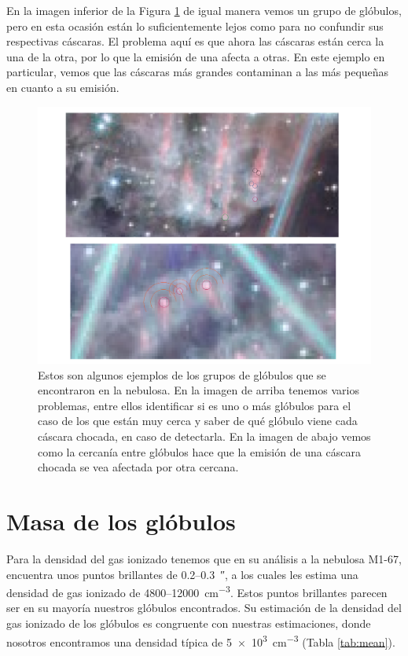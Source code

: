 \documentclass{book}
\begin{document}
En la imagen inferior de la Figura \ref{globule_group} de igual manera vemos un grupo de glóbulos, pero en esta ocasión están lo suficientemente lejos como para no confundir sus respectivas cáscaras. El problema aquí es que ahora las cáscaras están cerca la una de la otra, por lo que la emisión de una afecta a otras. En este ejemplo en particular, vemos que las cáscaras más grandes contaminan a las más pequeñas en cuanto a su emisión.\\

\begin{figure}[htb]
    \centering
    \includegraphics[width=\textwidth]{discusion/groups_globules.pdf}
    \caption{Estos son algunos ejemplos de los grupos de glóbulos que se encontraron en la nebulosa. En la imagen de arriba tenemos varios problemas, entre ellos identificar si es uno o más glóbulos para el caso de los que están muy cerca y saber de qué glóbulo viene cada cáscara chocada, en caso de detectarla. En la imagen de abajo vemos como la cercanía entre glóbulos hace que la emisión de una cáscara chocada se vea afectada por otra cercana.}
    \label{globule_group}
\end{figure}

\section{Masa de los glóbulos}\label{app:masa_glo}

Para la densidad del gas ionizado tenemos que \cite{Grosdidier:1998} en su análisis a la nebulosa M1-67, encuentra unos puntos brillantes de 0.2--\SI{0.3}{\arcsecond}, a los cuales les estima una densidad de gas ionizado de 4800--\SI{12 000}{cm^{-3}}. Estos puntos brillantes parecen ser en su mayoría nuestros glóbulos encontrados. Su estimación de la densidad del gas ionizado de los glóbulos es congruente con nuestras estimaciones, donde nosotros encontramos una densidad típica de \SI{5e3}{cm^{-3}} (Tabla \ref{tab:mean}).  
\end{document}
